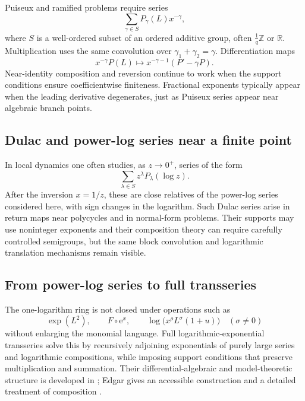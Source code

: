 \documentclass[11pt]{article}
\theoremstyle{pltheorem}
\newcommand{\R}{\mathbb R}
\newcommand{\Z}{\mathbb Z}
\newcommand{\e}{\mathrm e}
\newcommand{\compose}{\mathbin{\circ}}
\begin{document}
Puiseux and ramified problems require series
\begin{equation}\label{eq:generalized-exponent-series}
 \sum_{\gamma\in S}P_\gamma(L)x^{-\gamma},
\end{equation}
where \(S\) is a well-ordered subset of an ordered additive group, often
\(\frac1q\Z\) or \(\R\).  Multiplication uses the same convolution over
\(\gamma_1+\gamma_2=\gamma\).  Differentiation maps
\[
 x^{-\gamma}P(L)
 \longmapsto x^{-\gamma-1}(P'-\gamma P).
\]
Near-identity composition and reversion continue to work when the support conditions ensure coefficientwise finiteness.  Fractional exponents typically appear when the leading derivative degenerates, just as Puiseux series appear near algebraic branch points.

\subsection{Dulac and power-log series near a finite point}

In local dynamics one often studies, as \(z\to0^+\), series of the form
\begin{equation}\label{eq:Dulac-form}
 \sum_{\lambda\in S}z^\lambda P_\lambda(\log z).
\end{equation}
After the inversion \(x=1/z\), these are close relatives of the power-log series considered here, with sign changes in the logarithm.  Such Dulac series arise in return maps near polycycles and in normal-form problems.  Their supports may use noninteger exponents and their composition theory can require carefully controlled semigroups, but the same block convolution and logarithmic translation mechanisms remain visible.

\subsection{From power-log series to full transseries}

The one-logarithm ring is not closed under operations such as
\[
 \exp(L^2),
 \qquad
 F\compose\e^x,
 \qquad
 \log\bigl(x^\rho L^\sigma(1+u)\bigr)
 \quad(\sigma\ne0)
\]
without enlarging the monomial language.  Full logarithmic-exponential transseries solve this by recursively adjoining exponentials of purely large series and logarithmic compositions, while imposing support conditions that preserve multiplication and summation.  Their differential-algebraic and model-theoretic structure is developed in
\cite{vanderhoeven-book,adh-book}; Edgar gives an accessible construction and a detailed treatment of composition \cite{edgar-beginners,edgar-composition}.
\end{document}

